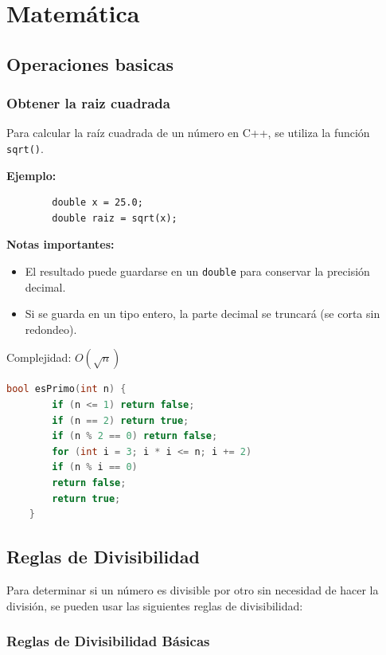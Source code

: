 \chapter{Matemática}

\section{Operaciones basicas}

\subsection{Obtener la raiz cuadrada}
Para calcular la raíz cuadrada de un número en C++, se utiliza la función \texttt{sqrt()}.

\bigskip

\textbf{Ejemplo:}

\begin{verbatim}
		double x = 25.0;
		double raiz = sqrt(x);
\end{verbatim}

\bigskip

\textbf{Notas importantes:}
\begin{itemize}
	\item El resultado puede guardarse en un \texttt{double} para conservar la precisión decimal.
	\item Si se guarda en un tipo entero, la parte decimal se truncará (se corta sin redondeo).
\end{itemize}

Complejidad: \( O(\sqrt{n}) \)
\begin{lstlisting}[language=C++, caption={Chequear si un número es primo}]
	bool esPrimo(int n) {
		if (n <= 1) return false;
		if (n == 2) return true;
		if (n % 2 == 0) return false;
		for (int i = 3; i * i <= n; i += 2)
		if (n % i == 0)
		return false;
		return true;
	}
\end{lstlisting}

\section{Reglas de Divisibilidad}

Para determinar si un número es divisible por otro sin necesidad de hacer la división, se pueden usar las siguientes reglas de divisibilidad:

\subsection{Reglas de Divisibilidad Básicas}

